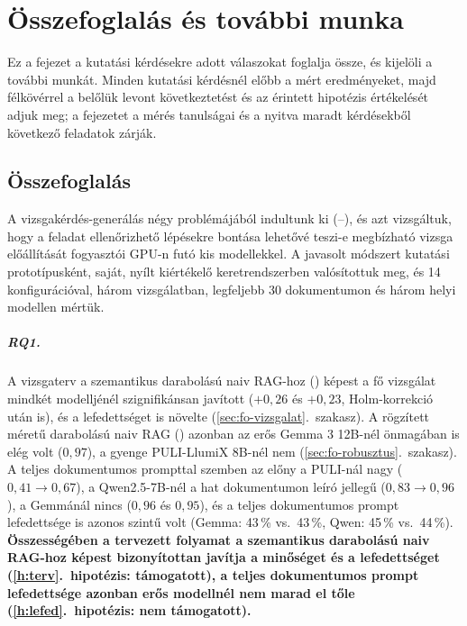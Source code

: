 \chapter{Összefoglalás és további munka}
\label{ch:osszefoglalas}

Ez a fejezet a kutatási kérdésekre adott válaszokat foglalja össze, és kijelöli a további munkát. Minden
kutatási kérdésnél előbb a mért eredményeket, majd félkövérrel a belőlük levont következtetést és az érintett
hipotézis értékelését adjuk meg; a fejezetet a mérés tanulságai és a nyitva maradt kérdésekből következő
feladatok zárják.

\section{Összefoglalás}

A vizsgakérdés-generálás négy problémájából indultunk ki (--), és azt vizsgáltuk, hogy a feladat
ellenőrizhető lépésekre bontása lehetővé teszi-e megbízható vizsga előállítását fogyasztói GPU-n futó kis
modellekkel. A javasolt \Mimir{} módszert kutatási prototípusként, saját, nyílt kiértékelő keretrendszerben
valósítottuk meg, és 14 konfigurációval, három vizsgálatban, legfeljebb 30 dokumentumon és három helyi modellen
mértük.

\paragraph{RQ1.} A vizsgaterv a szemantikus darabolású naiv RAG-hoz () képest a fő vizsgálat mindkét
modelljénél szignifikánsan javított ($+0{,}26$ és $+0{,}23$, Holm-korrekció után is), és a lefedettséget is
növelte (\ref{sec:fo-vizsgalat}.~szakasz). A rögzített méretű darabolású naiv RAG () azonban az
erős Gemma 3 12B-nél önmagában is elég volt ($0{,}97$), a gyenge PULI-LlumiX 8B-nél nem
(\ref{sec:fo-robusztus}.~szakasz). A teljes dokumentumos prompttal szemben az előny a PULI-nál nagy
($0{,}41\to0{,}67$), a Qwen2.5-7B-nél a hat dokumentumon leíró jellegű ($0{,}83\to0{,}96$), a Gemmánál nincs
($0{,}96$ és $0{,}95$), és a teljes dokumentumos prompt lefedettsége is azonos szintű volt (Gemma: 43\,\% vs.\
43\,\%, Qwen: 45\,\% vs.\ 44\,\%). \textbf{Összességében a tervezett folyamat a szemantikus darabolású naiv
RAG-hoz képest bizonyítottan javítja a minőséget és a lefedettséget (\ref{h:terv}.~hipotézis: támogatott), a
teljes dokumentumos prompt lefedettsége azonban erős modellnél nem marad el tőle (\ref{h:lefed}.~hipotézis: nem
támogatott).}

